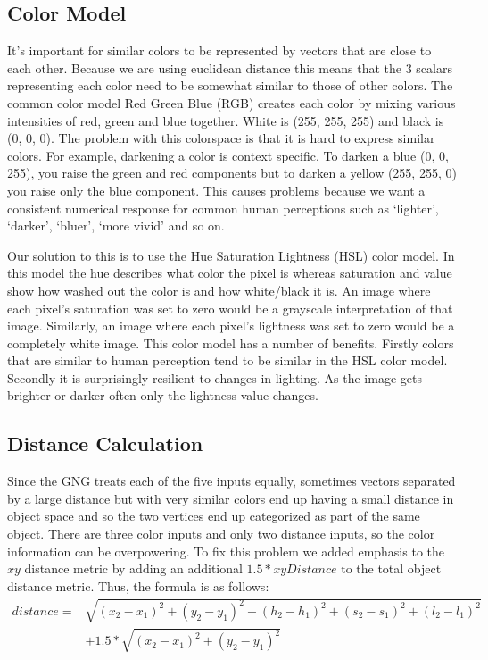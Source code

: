 \documentclass{article}
\renewcommand{\|}{\origbar} %
\begin{document}
\subsection{Color Model}
\label{sec:colorModel}

It's important for similar colors to be represented by vectors that are close to each other. Because we are using euclidean distance this means that the 3 scalars representing each color need to be somewhat similar to those of other colors. The common color model Red Green Blue (RGB) creates each color by mixing various intensities of red, green and blue together. White is (255, 255, 255) and black is (0, 0, 0). The problem with this colorspace is that it is hard to express similar colors. For example, darkening a color is context specific. To darken a blue (0, 0, 255), you raise the green and red components but to darken a yellow (255, 255, 0) you raise only the blue component. This causes problems because we want a consistent numerical response for common human perceptions such as `lighter', `darker', `bluer', `more vivid' and so on.

Our solution to this is to use the Hue Saturation Lightness (HSL) color model. In this model the hue describes what color the pixel is whereas saturation and value show how washed out the color is and how white/black it is. An image where each pixel's saturation was set to zero would be a grayscale interpretation of that image. Similarly, an image where each pixel's lightness was set to zero would be a completely white image. This color model has a number of benefits. Firstly colors that are similar to human perception tend to be similar in the HSL color model. Secondly it is surprisingly resilient to changes in lighting. As the image gets brighter or darker often only the lightness value changes.


\subsection{Distance Calculation}


Since the GNG treats each of the five inputs equally, sometimes vectors separated by a large distance but with very similar colors end up having a small distance in object space and so the two vertices end up categorized as part of the same object. There are three color inputs and only two distance inputs, so the color information can be overpowering. To fix this problem we added emphasis to the $xy$ distance metric by adding an additional $1.5 * xyDistance$ to the total object distance metric. Thus, the formula is as follows:
\begin{align*}
  distance = &\sqrt{(x_2-x_1)^2+(y_2-y_1)^2+(h_2-h_1)^2+(s_2-s_1)^2+(l_2-l_1)^2} \\ &+ 1.5*\sqrt{(x_2-x_1)^2+(y_2-y_1)^2}
\end{align*}
\end{document}
